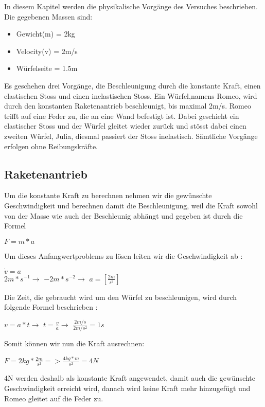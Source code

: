\documentclass[../main.tex]{subfiles}
\begin{document}
In diesem Kapitel werden die physikalische Vorgänge des Versuches beschrieben. 
Die gegebenen Massen sind:
\begin{itemize}
	\item Gewicht(m) = 2kg
	\item Velocity(v) = 2m/s
	\item Würfelseite = 1.5m
\end{itemize}
Es geschehen drei Vorgänge, die Beschleunigung durch die konstante Kraft, einen elastischen Stoss und einen inelastischen Stoss.
Ein Würfel,namens Romeo, wird durch den konstanten Raketenantrieb beschleunigt, bis maximal 2m/s. Romeo trifft auf eine Feder zu, die an eine Wand befestigt ist. Dabei geschieht ein elastischer Stoss und der Würfel gleitet wieder zurück und stösst dabei einen zweiten Würfel, Julia, diesmal passiert der Stoss inelastisch. Sämtliche Vorgänge erfolgen ohne Reibungskräfte.
\subsection{Raketenantrieb}
Um die konstante Kraft zu berechnen nehmen wir die gewünschte Geschwindigkeit und berechnen damit die Beschleunigung, weil die Kraft sowohl von der Masse wie auch der Beschleunig abhängt und gegeben ist durch die Formel\cite{tiplerpaula.PhysikFurStudierende}
\begin{mdframed}
		 $F = m*a$
\end{mdframed}
Um dieses Anfangwertproblems zu lösen leiten wir die Geschwindigkeit ab \cite{tiplerpaula.PhysikFurStudierende}:
\begin{mdframed}
		 $\dot{v} = a$\\
$2m*s^{-1} \rightarrow$  $-2m*s^{-2} \rightarrow$  $a = [\frac{2m}{s^{2}}]$
\end{mdframed}
Die Zeit, die gebraucht wird um den Würfel zu beschleunigen, wird durch folgende Formel beschrieben \cite{tiplerpaula.PhysikFurStudierende}:
\begin{mdframed}
 $v=a*t \rightarrow$ $t=\frac{v}{a} \rightarrow$ $\frac{2m/s}{2m/s^{2}} = 1s$
\end{mdframed}
Somit können wir nun die Kraft ausrechnen:
\begin{mdframed}
$F = 2kg * \frac{2m}{s^{2}} => \frac{4kg*m}{s^{2}} = 4N$
\end{mdframed}
4N werden deshalb als konstante Kraft angewendet, damit auch die gewünschte Geschwindigkeit erreicht wird, danach wird keine Kraft mehr hinzugefügt und Romeo gleitet auf die Feder zu.
\newpage
\end{document}
